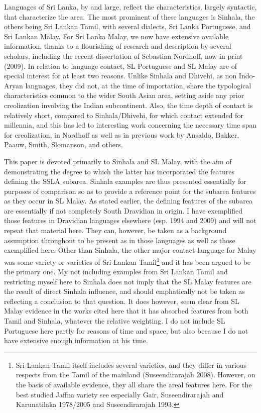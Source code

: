 \documentclass[letterpaper]{article}
\begin{document}
Languages of Sri Lanka, by and large, reflect the characteristics, largely syntactic, that characterize the area. The most prominent of these languages is Sinhala, the others being Sri Lankan Tamil, with several dialects, Sri Lanka Portuguese, and Sri Lankan Malay. For Sri Lanka Malay, we now have extensive available information, thanks to a flourishing of research and description by several scholars, including the recent dissertation of Sebastian Nordhoff, now in print (2009). In relation to language contact, SL Portuguese and SL Malay are of special interest for at least two reasons. Unlike Sinhala and Dhivehi, as non Indo-Aryan languages, they did not, at the time of importation, share the typological characteristics common to the wider South Asian area, setting aside any prior creolization involving the Indian subcontinent. Also, the time depth of contact is relatively short, compared to Sinhala/Dhivehi, for which contact extended for millennia, and this has led to interesting work concerning the necessary time span for creolization, in Nordhoff as well as in previous work by Ansaldo, Bakker, Paauw, Smith, Slomanson, and others. 

This paper is devoted primarily to Sinhala and SL Malay, with the aim of demonstrating the degree to which the latter has incorporated the features defining the SSLA subarea. Sinhala examples are thus presented essentially for purposes of comparison so as to provide a reference point for the subarea features as they occur in SL Malay. As stated earlier, the defining features of the subarea are essentially if not completely South Dravidian in origin. I have exemplified those features in Dravidian  languages elsewhere (esp. 1994 and 2009) and will not repeat that material here. They can, however, be taken as a background assumption throughout to be present as in those languages as well as those exemplified here. Other than Sinhala, the other major contact language for Malay was some variety or varieties of Sri Lankan Tamil\footnote{Sri
  Lankan Tamil itself includes several varieties, and they differ in various respects from the Tamil of the mainland (Suseendirarajah 2008). However, on the basis of available evidence, they all share the areal features here. For the best studied Jaffna variety see especially Gair, Suseendirarajah and Karunatilaka  1978/2005 and Suseendirarajah 1993.
} 
and it has been argued to be the primary one. My not including examples from Sri Lankan Tamil and restricting myself here to Sinhala does not imply that the SL Malay features are the result of direct Sinhala influence, and should emphatically not be taken as reflecting a conclusion to that question. It does however, seem clear from SL Malay evidence in the works cited here that it has absorbed features from both Tamil and Sinhala, whatever the relative weighting. I do not include SL Portuguese here partly for reasons of time and space, but also because I do not have extensive enough information at his time.
\end{document}
